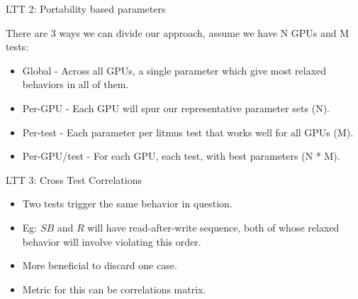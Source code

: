 \documentclass{beamer}
\begin{document}
    \begin{frame}{LTT 2: Portability based parameters}
        
        There are 3 ways we can divide our approach, assume we have N GPUs and M tests:
        \begin{itemize}
            \item Global - Across all GPUs, a single parameter which give most relaxed behaviors in all of them.
            \item Per-GPU - Each GPU will spur our representative parameter sets (N).
            \item Per-test - Each parameter per litmus test that works well for all GPUs (M).
            \item Per-GPU/test - For each GPU, each test, with best parameters (N * M). 
        \end{itemize}
        
    \end{frame}


    \begin{frame}{LTT 3: Cross Test  Correlations}
        
        \begin{itemize}
            \item Two tests trigger the same behavior in question.
            \item Eg: $SB$ and $R$ will have read-after-write sequence, both of whose relaxed behavior will involve violating this order. 
            \item More beneficial to discard one case.
            \item Metric for this can be correlations matrix.
        \end{itemize}
        
        \begin{figure}
        \end{figure}

    \end{frame}
\end{document}
